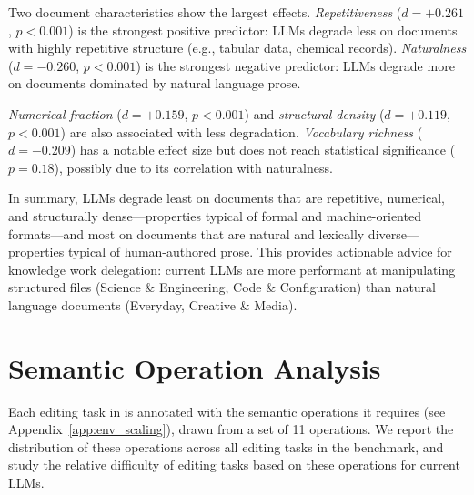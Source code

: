 \documentclass{article} %
\begin{document}
Two document characteristics show the largest effects. \textit{Repetitiveness} ($d = {+}0.261$, $p < 0.001$) is the strongest positive predictor: LLMs degrade less on documents with highly repetitive structure (e.g., tabular data, chemical records). \textit{Naturalness} ($d = {-}0.260$, $p < 0.001$) is the strongest negative predictor: LLMs degrade more on documents dominated by natural language prose.

\textit{Numerical fraction} ($d = {+}0.159$, $p < 0.001$) and \textit{structural density} ($d = {+}0.119$, $p < 0.001$) are also associated with less degradation. \textit{Vocabulary richness} ($d = {-}0.209$) has a notable effect size but does not reach statistical significance ($p = 0.18$), possibly due to its correlation with naturalness.

In summary, LLMs degrade least on documents that are repetitive, numerical, and structurally dense---properties typical of formal and machine-oriented formats---and most on documents that are natural and lexically diverse---properties typical of human-authored prose. This provides actionable advice for knowledge work delegation: current LLMs are more performant at manipulating structured files (Science \& Engineering, Code \& Configuration) than natural language documents (Everyday, Creative \& Media).


\section{Semantic Operation Analysis} \label{app:semantic_ops}

Each editing task in \benchmark{} is annotated with the semantic operations it requires (see Appendix~\ref{app:env_scaling}), drawn from a set of 11 operations. We report the distribution of these operations across all editing tasks in the benchmark, and study the relative difficulty of editing tasks based on these operations for current LLMs.
\end{document}

